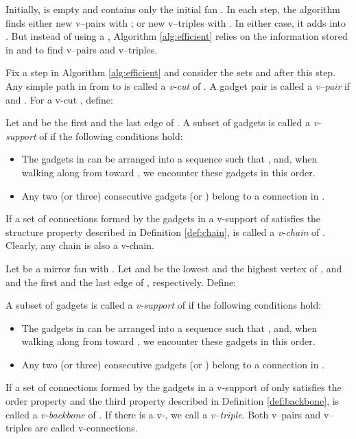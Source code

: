 \documentclass[11pt]{article}
\begin{document}
Initially,  is empty and  contains only the
initial fan . In each step, the algorithm
finds either new v--pairs  with ;
or new v--triples  with .
In either case, it adds  into .
But instead of using a , Algorithm \ref{alg:efficient}
relies on the information stored in  and  to
find v--pairs and v--triples.

Fix a step in Algorithm \ref{alg:efficient} and consider the sets
 and  after this step.
Any simple path  in  from  to  is called a {\em v-cut}
of . A gadget pair  is called a {\em v--pair} if
 and .
For a v-cut , define:


Let  and  be the first and the last edge of .
A subset of gadgets 
is called a {\em v-support} of  if the following conditions hold:
\begin{itemize}
\item The gadgets in  can be arranged into a sequence 
such that
,  and, when walking along
 from  toward , we encounter these gadgets in this order.

\item Any two (or three) consecutive gadgets 
(or ) belong to a connection in .
\end{itemize}

If a set  of connections formed by the gadgets in a v-support of 
satisfies the structure property described in Definition \ref{def:chain},
 is called a {\em v-chain} of .  Clearly, any chain is also a
v-chain.

Let  be a mirror fan with . Let  and  be
the lowest and the highest vertex of , and  and 
the first and the last edge of , respectively. Define:


A subset of gadgets 
is called a {\em v-support} of  if the following conditions hold:
\begin{itemize}
\item The gadgets in  can be arranged into a sequence  such that
,  and, when walking along 
from  toward , we encounter these gadgets in this order.

\item Any two (or three) consecutive gadgets 
(or ) belong to a connection in .
\end{itemize}

If a set  of connections formed by the gadgets in a v-support of 
only satisfies the order property  and
the third property described in Definition \ref{def:backbone},
 is called a {\em v-backbone} of . If there is a
v-, we call  a {\em v--triple}.
Both v--pairs and v--triples are called v-connections.
\end{document}
